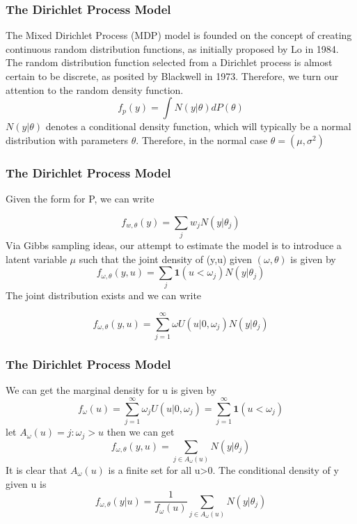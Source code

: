 \documentclass{beamer}
\begin{document}
\begin{frame}
    \frametitle{The Dirichlet Process Model}

    The Mixed Dirichlet Process (MDP) model is founded on the concept of creating continuous random distribution functions, as initially proposed by Lo in 1984. The random distribution function selected from a Dirichlet process is almost certain to be discrete, as posited by Blackwell in 1973. Therefore, we turn our attention to the random density function.
    \begin{equation*}
    f_p(y) = \int N(y|\theta)dP(\theta)
    \end{equation*}
    $N(y|\theta)$ denotes a conditional density function, which will typically be a normal distribution with parameters $\theta$. Therefore, in the normal case $\theta = (\mu, \sigma^2)$

\end{frame}

\begin{frame}
    \frametitle{The Dirichlet Process Model}
    Given the form for P, we can write

    \begin{equation*}
    f_{w,\theta}(y) = \sum_j w_j N(y|\theta_j)
    \end{equation*} 
    Via Gibbs sampling ideas, our attempt to estimate the model is to introduce a latent variable $\mu$ such that the joint density of (y,u) given $(\omega, \theta)$ is given by 
    \begin{equation*}
    f_{\omega,\theta}(y,u)= \sum_j \textbf{1} (u < \omega_j)N(y|\theta_j)
    \end{equation*}
    The joint distribution exists and we can write
    
    \begin{equation*}
    f_{\omega, \theta}(y,u) = \sum_{j=1}^{\infty}\omega U(u|0,\omega_j)N(y|\theta_j)
    \end{equation*}

\end{frame}

\begin{frame}
    \frametitle{The Dirichlet Process Model}
    We can get the marginal density for u is given by
    \begin{equation*}
    f_\omega(u)=\sum_{j=1}^{\infty}\omega_j U(u|0,\omega_j) = \sum_{j=1}^{\infty}\textbf{1}(u<\omega_j)
    \end{equation*}
    let $A_\omega(u) = {j:\omega_j>u}$
    then we can get
    \begin{equation*}
    f_{\omega, \theta}(y, u) = \sum_{j\in A_\omega(u)} N(y|\theta_j)
    \end{equation*}
    It is clear that $A_\omega(u)$ is a finite set for all u>0. The conditional density of y given u is
    \begin{equation*}
    f_{\omega, \theta}(y|u)=\frac{1}{f_\omega(u)}\sum_{j \in A_\omega(u)} N(y|\theta_j)
    \end{equation*}
    
\end{frame}
\end{document}
